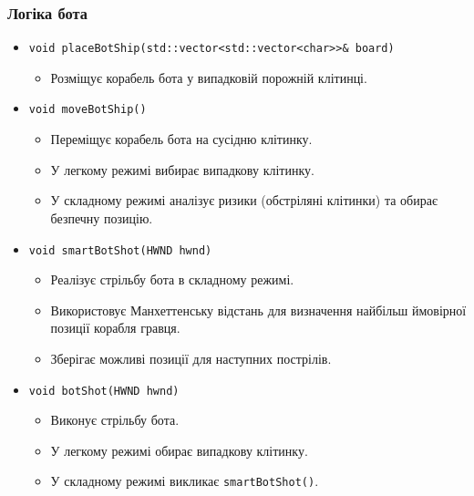 \documentclass[12pt]{article}
\begin{document}
\subsubsection{Логіка бота}
\begin{itemize}
    \item \texttt{void placeBotShip(std::vector<std::vector<char>>\& board)}
    \begin{itemize}
        \item Розміщує корабель бота у випадковій порожній клітинці.
    \end{itemize}
    \item \texttt{void moveBotShip()}
    \begin{itemize}
        \item Переміщує корабель бота на сусідню клітинку.
        \item У легкому режимі вибирає випадкову клітинку.
        \item У складному режимі аналізує ризики (обстріляні клітинки) та обирає безпечну позицію.
    \end{itemize}
    \item \texttt{void smartBotShot(HWND hwnd)}
    \begin{itemize}
        \item Реалізує стрільбу бота в складному режимі.
        \item Використовує Манхеттенську відстань для визначення найбільш ймовірної позиції корабля гравця.
        \item Зберігає можливі позиції для наступних пострілів.
    \end{itemize}
    \item \texttt{void botShot(HWND hwnd)}
    \begin{itemize}
        \item Виконує стрільбу бота.
        \item У легкому режимі обирає випадкову клітинку.
        \item У складному режимі викликає \texttt{smartBotShot()}.
    \end{itemize}
\end{itemize}
\end{document}

